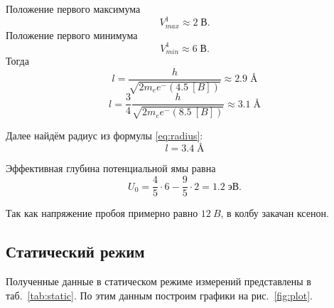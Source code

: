 \documentclass[a4paper, 12pt]{article}
\begin{document}
Положение первого максимума $$ V_{max}^1 \approx 2 \;В.$$
Положение первого минимума $$ V_{min}^1 \approx 6 \; В.$$
Тогда 
\begin{equation*}\label{key}
	l = \frac{h}{\sqrt{2 m_e e^- (4.5~[B])}} \approx 2.9\; \text{\AA{}}
\end{equation*}
\begin{equation*}
	l = \frac{3}{4} \frac{h}{\sqrt{2 m_e e^- (8.5~[B])}} \approx 3.1\; \text{\AA{}}
\end{equation*}

Далее найдём радиус из формулы \eqref{eq:radius}:
\begin{equation*}\label{key}
	l = 3.4 \; \text{\AA{}}
\end{equation*}

Эффективная глубина потенциальной ямы равна
\begin{equation*}\label{key}
	U_0 = \frac{4}{5} \cdot 6 - \frac{9}{5} \cdot 2 = 1.2 \;эВ.
\end{equation*}

Так как напряжение пробоя примерно равно $ 12~B$, в колбу закачан ксенон.

\subsection{Статический режим}

Полученные данные в статическом режиме измерений представлены в таб.~\ref{tab:static}. По этим данным построим графики на рис.~\ref{fig:plot}.
\end{document}
